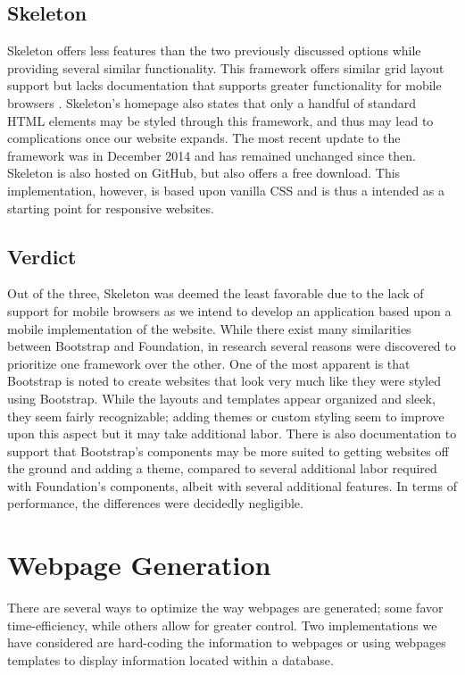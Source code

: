 \documentclass[letterpaper,10pt, draftclsnofoot,onecolumn]{IEEEtran}
\begin{document}
{{{{{{{{{{\subsection[Skeleton]{\color{black}
Skeleton}
{\color{black}\normalsize\noindent
{Skeleton offers less features than the two previously discussed options while providing several similar functionality. 
This framework offers similar grid layout support but lacks documentation that supports greater functionality for mobile browsers \cite{website2}.
Skeleton’s homepage also states that only a handful of standard HTML elements may be styled through this framework, and thus may lead to complications once our website expands.
The most recent update to the framework was in December 2014 and has remained unchanged since then. Skeleton is also hosted on GitHub, but also offers a free download. 
This implementation, however, is based upon vanilla CSS and is thus a intended as a starting point for responsive websites.}
 
\subsection[Verdict]{\color{black}
Verdict}
{\color{black}\normalsize\noindent
{Out of the three, Skeleton was deemed the least favorable due to the lack of support for mobile browsers as we intend to develop an application based upon a mobile implementation of the website. 
While there exist many similarities between Bootstrap and Foundation, in research several reasons were discovered to prioritize one framework over the other.
One of the most apparent is that Bootstrap is noted to create websites that look very much like they were styled using Bootstrap. 
While the layouts and templates appear organized and sleek, they seem fairly recognizable; adding themes or custom styling seem to improve upon this aspect but it may take additional labor. 
There is also documentation to support that Bootstrap’s components may be more suited to getting websites off the ground and adding a theme, compared to several additional labor required with Foundation’s components, albeit with several additional features. 
In terms of performance, the differences were decidedly negligible.}

\section[Webpage Generation]{\color{black}
Webpage Generation}
{\color{black}\normalsize\noindent
{There are several ways to optimize the way webpages are generated; some favor time-efficiency, while others allow for greater control. Two implementations we have considered are hard-coding the information to webpages or using webpages templates to display information located within a database. }

}}}}}}}}}}}}}
\end{document}
